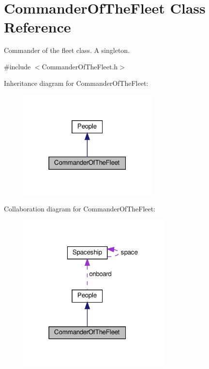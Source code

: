 \hypertarget{classCommanderOfTheFleet}{}\section{Commander\+Of\+The\+Fleet Class Reference}
\label{classCommanderOfTheFleet}


Commander of the fleet class. A singleton.  




{\ttfamily \#include $<$Commander\+Of\+The\+Fleet.\+h$>$}



Inheritance diagram for Commander\+Of\+The\+Fleet\+:\nopagebreak
\begin{figure}[H]
\begin{center}
\leavevmode
\includegraphics[width=199pt]{classCommanderOfTheFleet__inherit__graph}
\end{center}
\end{figure}


Collaboration diagram for Commander\+Of\+The\+Fleet\+:\nopagebreak
\begin{figure}[H]
\begin{center}
\leavevmode
\includegraphics[width=219pt]{classCommanderOfTheFleet__coll__graph}
\end{center}
\end{figure}
